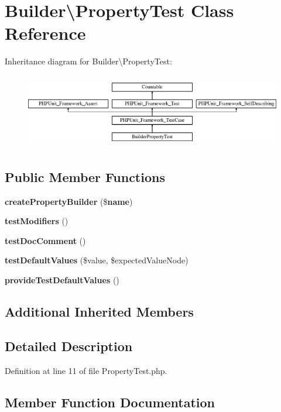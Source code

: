 \section{Builder\textbackslash{}Property\+Test Class Reference}
\label{class_php_parser_1_1_builder_1_1_property_test}
Inheritance diagram for Builder\textbackslash{}Property\+Test\+:\begin{figure}[H]
\begin{center}
\leavevmode
\includegraphics[height=3.303835cm]{class_php_parser_1_1_builder_1_1_property_test}
\end{center}
\end{figure}
\subsection*{Public Member Functions}
\begin{DoxyCompactItemize}
\item 
{\bf create\+Property\+Builder} (\${\bf name})
\item 
{\bf test\+Modifiers} ()
\item 
{\bf test\+Doc\+Comment} ()
\item 
{\bf test\+Default\+Values} (\$value, \$expected\+Value\+Node)
\item 
{\bf provide\+Test\+Default\+Values} ()
\end{DoxyCompactItemize}
\subsection*{Additional Inherited Members}


\subsection{Detailed Description}


Definition at line 11 of file Property\+Test.\+php.



\subsection{Member Function Documentation}
